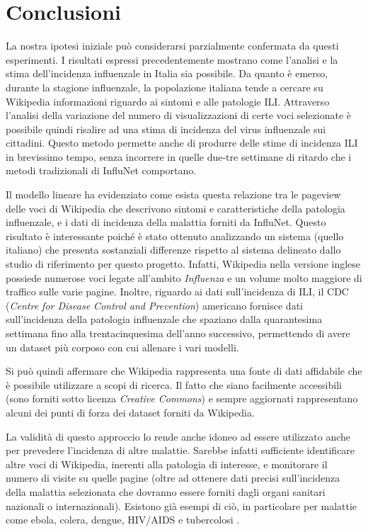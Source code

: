 \newpage

\chapter{Conclusioni}
\bigskip

La nostra ipotesi iniziale può considerarsi parzialmente confermata da questi esperimenti. 
I risultati espressi precedentemente mostrano come l'analisi e la stima dell'incidenza influenzale in Italia sia possibile.
Da quanto è emerso, durante la stagione influenzale, la popolazione italiana tende a cercare su Wikipedia informazioni 
riguardo ai sintomi e alle patologie ILI. Attraverso l'analisi della variazione del numero di visualizzazioni di certe voci 
selezionate è possibile quindi risalire ad una stima di incidenza del virus influenzale sui cittadini. Questo metodo 
permette anche di produrre delle stime di incidenza ILI in brevissimo tempo, senza incorrere in quelle due-tre settimane di ritardo che i metodi tradizionali di InfluNet comportano. 
\bigskip 

Il modello lineare ha evidenziato come esista questa relazione tra le pageview delle voci di Wikipedia che descrivono 
sintomi e caratteristiche della patologia influenzale, e i dati di incidenza della malattia forniti da InfluNet. Questo 
risultato è interessante poiché è stato ottenuto analizzando un sistema (quello italiano) che presenta sostanziali differenze 
rispetto al sistema delineato dallo studio di riferimento per questo progetto. Infatti, Wikipedia nella versione inglese 
possiede numerose voci legate all'ambito \textit{Influenza} e un volume molto maggiore di traffico sulle varie pagine. 
Inoltre, riguardo ai dati sull'incidenza di ILI, il CDC (\textit{Centre for Disease Control and Prevention}) americano 
fornisce dati sull'incidenza della patologia influenzale che spaziano dalla quarantesima settimana fino alla trentacinquesima 
dell'anno successivo, permettendo di avere un dataset più corposo con cui allenare i vari modelli.      
\bigskip

Si può quindi affermare che Wikipedia rappresenta una fonte di dati affidabile che è possibile 
utilizzare a scopi di ricerca. Il fatto che siano facilmente accessibili (sono forniti sotto licenza \textit{Creative 
Commons}) e sempre aggiornati rappresentano alcuni dei punti di forza dei dataset forniti da Wikipedia.   
\bigskip

La validità di questo approccio lo rende anche idoneo ad essere utilizzato anche per prevedere l'incidenza di altre malattie. 
Sarebbe infatti sufficiente identificare altre voci di Wikipedia, inerenti alla patologia di interesse, e monitorare il 
numero di visite su quelle pagine (oltre ad ottenere dati precisi sull'incidenza della malattia selezionata che dovranno 
essere forniti dagli organi sanitari nazionali o internazionali). Esistono già esempi di ciò, in particolare per malattie 
come ebola, colera, dengue, HIV/AIDS e tubercolosi \cite{Generous2014}.
\bigskip

